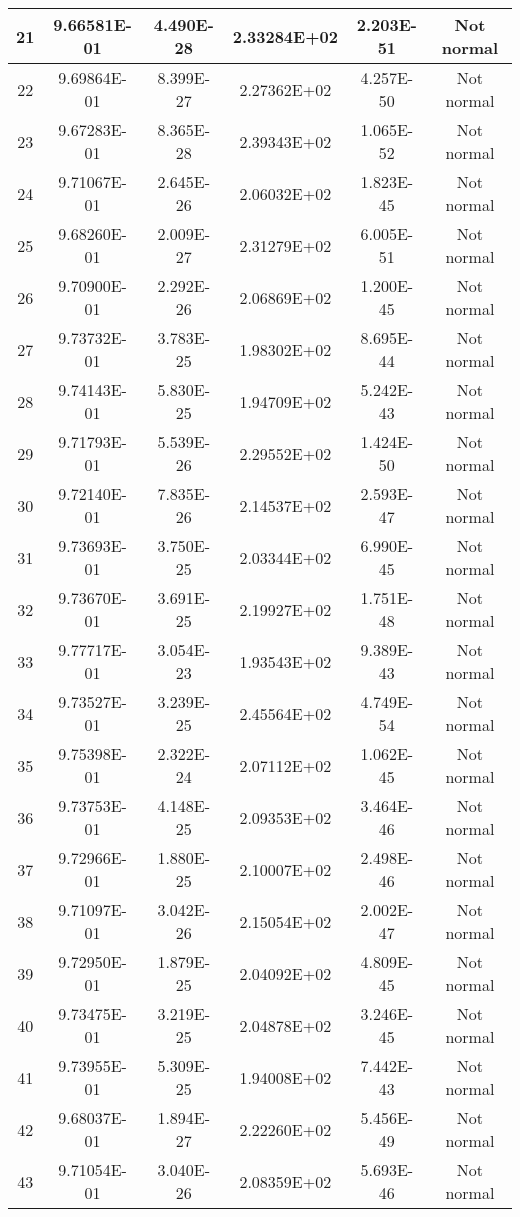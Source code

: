 \begin{table}[h]
\begin{tabular}{|c|c|c|c|c|c|}
		21 & 9.66581E-01 & 4.490E-28 & 2.33284E+02 & 2.203E-51 & Not normal\\\hline
		22 & 9.69864E-01 & 8.399E-27 & 2.27362E+02 & 4.257E-50 & Not normal\\\hline
		23 & 9.67283E-01 & 8.365E-28 & 2.39343E+02 & 1.065E-52 & Not normal\\\hline
		24 & 9.71067E-01 & 2.645E-26 & 2.06032E+02 & 1.823E-45 & Not normal\\\hline
		25 & 9.68260E-01 & 2.009E-27 & 2.31279E+02 & 6.005E-51 & Not normal\\\hline
		26 & 9.70900E-01 & 2.292E-26 & 2.06869E+02 & 1.200E-45 & Not normal\\\hline
		27 & 9.73732E-01 & 3.783E-25 & 1.98302E+02 & 8.695E-44 & Not normal\\\hline
		28 & 9.74143E-01 & 5.830E-25 & 1.94709E+02 & 5.242E-43 & Not normal\\\hline
		29 & 9.71793E-01 & 5.539E-26 & 2.29552E+02 & 1.424E-50 & Not normal\\\hline
		30 & 9.72140E-01 & 7.835E-26 & 2.14537E+02 & 2.593E-47 & Not normal\\\hline
		31 & 9.73693E-01 & 3.750E-25 & 2.03344E+02 & 6.990E-45 & Not normal\\\hline
		32 & 9.73670E-01 & 3.691E-25 & 2.19927E+02 & 1.751E-48 & Not normal\\\hline
		33 & 9.77717E-01 & 3.054E-23 & 1.93543E+02 & 9.389E-43 & Not normal\\\hline
		34 & 9.73527E-01 & 3.239E-25 & 2.45564E+02 & 4.749E-54 & Not normal\\\hline
		35 & 9.75398E-01 & 2.322E-24 & 2.07112E+02 & 1.062E-45 & Not normal\\\hline
		36 & 9.73753E-01 & 4.148E-25 & 2.09353E+02 & 3.464E-46 & Not normal\\\hline
		37 & 9.72966E-01 & 1.880E-25 & 2.10007E+02 & 2.498E-46 & Not normal\\\hline
		38 & 9.71097E-01 & 3.042E-26 & 2.15054E+02 & 2.002E-47 & Not normal\\\hline
		39 & 9.72950E-01 & 1.879E-25 & 2.04092E+02 & 4.809E-45 & Not normal\\\hline
		40 & 9.73475E-01 & 3.219E-25 & 2.04878E+02 & 3.246E-45 & Not normal\\\hline
		41 & 9.73955E-01 & 5.309E-25 & 1.94008E+02 & 7.442E-43 & Not normal\\\hline
		42 & 9.68037E-01 & 1.894E-27 & 2.22260E+02 & 5.456E-49 & Not normal\\\hline
		43 & 9.71054E-01 & 3.040E-26 & 2.08359E+02 & 5.693E-46 & Not normal\\\hline

\end{tabular}
\end{table}
